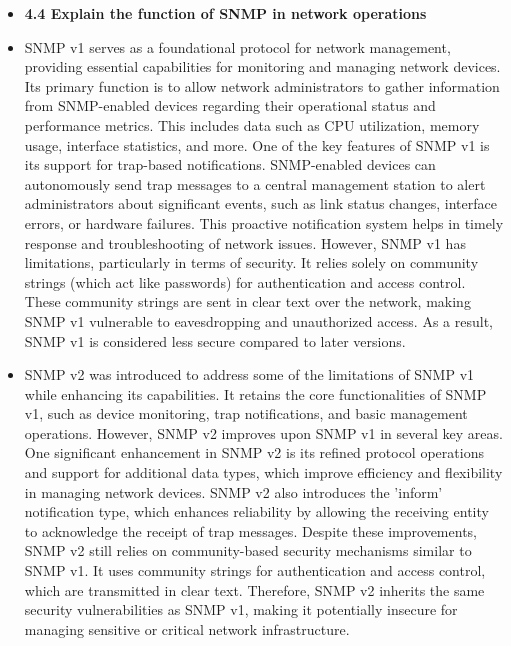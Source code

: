 \documentclass{article}
\begin{document}
\begin{itemize}
  \item \textbf{4.4 Explain the function of SNMP in network operations}
  	\item[] SNMP v1 serves as a foundational protocol for network management, providing essential capabilities for monitoring and managing network devices. Its primary function is to allow network administrators to gather information from SNMP-enabled devices regarding their operational status and performance metrics. This includes data such as CPU utilization, memory usage, interface statistics, and more. One of the key features of SNMP v1 is its support for trap-based notifications. SNMP-enabled devices can autonomously send trap messages to a central management station to alert administrators about significant events, such as link status changes, interface errors, or hardware failures. This proactive notification system helps in timely response and troubleshooting of network issues. However, SNMP v1 has limitations, particularly in terms of security. It relies solely on community strings (which act like passwords) for authentication and access control. These community strings are sent in clear text over the network, making SNMP v1 vulnerable to eavesdropping and unauthorized access. As a result, SNMP v1 is considered less secure compared to later versions.
	\item[] SNMP v2 was introduced to address some of the limitations of SNMP v1 while enhancing its capabilities. It retains the core functionalities of SNMP v1, such as device monitoring, trap notifications, and basic management operations. However, SNMP v2 improves upon SNMP v1 in several key areas. One significant enhancement in SNMP v2 is its refined protocol operations and support for additional data types, which improve efficiency and flexibility in managing network devices. SNMP v2 also introduces the 'inform' notification type, which enhances reliability by allowing the receiving entity to acknowledge the receipt of trap messages. Despite these improvements, SNMP v2 still relies on community-based security mechanisms similar to SNMP v1. It uses community strings for authentication and access control, which are transmitted in clear text. Therefore, SNMP v2 inherits the same security vulnerabilities as SNMP v1, making it potentially insecure for managing sensitive or critical network infrastructure.

\end{itemize}
\end{document}
